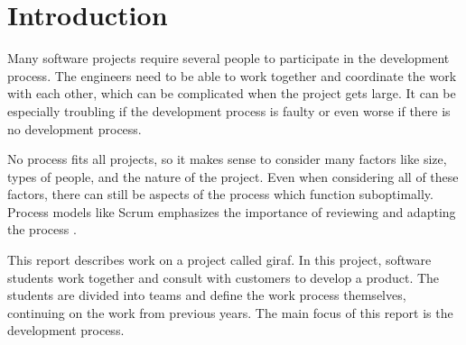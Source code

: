 \chapter{Introduction}

Many software projects require several people to participate in the development process. The engineers need to be able to work together and coordinate the work with each other, which can be complicated when the project gets large. It can be especially troubling if the development process is faulty or even worse if there is no development process.

No process fits all projects, so it makes sense to consider many factors like size, types of people, and the nature of the project. Even when considering all of these factors, there can still be aspects of the process which function suboptimally. Process models like \gls{Scrum} emphasizes the importance of reviewing and adapting the process \cite{Scrum}.

This report describes work on a project called \gls{giraf}. In this project, software students work together and consult with customers to develop a product. The students are divided into teams and define the work process themselves, continuing on the work from previous years. The main focus of this report is the development process.